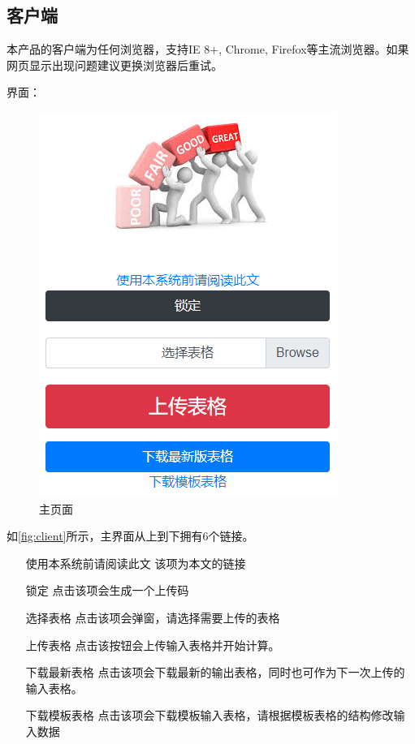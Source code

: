 \documentclass[UTF8,fontset=windowsnew]{ctexart}
\begin{document}
\subsection{客户端}
本产品的客户端为任何浏览器，支持IE 8+, Chrome, Firefox等主流浏览器。如果网页显示出现问题建议更换浏览器后重试。\par
界面：\par
\begin{figure}[h]
  \centering
  \includegraphics[width=.5\textwidth]{image/client.png}
  \caption{主页面}
  \label{fig:client}
\end{figure}
如\autoref{fig:client}所示，主界面从上到下拥有6个链接。\par
\begin{itemize}
  \setlength{\itemindent}{4em}
  \item [使用本系统前请阅读此文] 该项为本文的链接
  \item [锁定] 点击该项会生成一个上传码
  \item [选择表格] 点击该项会弹窗，请选择需要上传的表格
  \item [上传表格] 点击该按钮会上传输入表格并开始计算。
  \item [下载最新表格] 点击该项会下载最新的输出表格，同时也可作为下一次上传的输入表格。
  \item [下载模板表格] 点击该项会下载模板输入表格，请根据模板表格的结构修改输入数据
\end{itemize}
\end{document}
